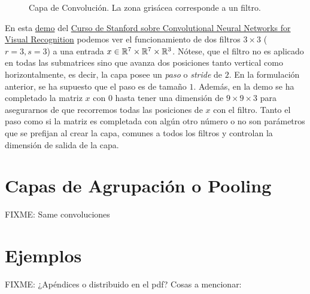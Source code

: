 \begin{figure}
\centering


\caption{Capa de Convolución. La zona grisácea corresponde a un filtro. }
\label{fig:convolution}
\end{figure}

En esta \href{https://cs231n.github.io/assets/conv-demo/index.html}{demo} del \href{http://cs231n.stanford.edu/}{Curso de Stanford sobre Convolutional Neural Networks for Visual Recognition} podemos ver el funcionamiento de dos filtros $3\times 3$ ($r=3,s=3$) a una entrada $x\in\mathbb{R}^7\times\mathbb{R}^7\times\mathbb{R}^3$. Nótese, que el filtro no es aplicado en todas las submatrices sino que avanza dos posiciones tanto vertical como horizontalmente, es decir, la capa posee un \emph{paso} o \emph{stride} de $2$. En la formulación anterior, se ha supuesto que el paso es de tamaño $1$. Además, en la demo se ha completado la matriz $x$ con $0$ hasta tener una dimensión de $9\times 9\times 3$ para asegurarnos de que recorremos todas las posiciones de $x$ con el filtro. Tanto el paso como si la matriz es completada con algún otro número o no son parámetros que se prefijan al crear la capa, comunes a todos los filtros y controlan la dimensión de salida de la capa.


\section{Capas de Agrupación o Pooling}

FIXME: Same convoluciones

\section{Ejemplos}

FIXME: ¿Apéndices o distribuido en el pdf? Cosas a mencionar:

